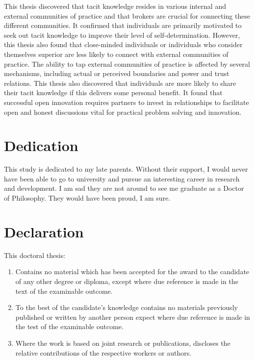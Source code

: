 \documentclass[12pt,table]{book}
\begin{document}
This thesis discovered that tacit knowledge resides in various internal and external communities of practice and that brokers are crucial for connecting these different communities. It confirmed that individuals are primarily motivated to seek out tacit knowledge to improve their level of self-determination. However, this thesis also found that close-minded individuals or individuals who consider themselves superior are less likely to connect with external communities of practice. The ability to tap external communities of practice is affected by several mechanisms, including actual or perceived boundaries and power and trust relations. This thesis also discovered that individuals are more likely to share their tacit knowledge if this delivers some personal benefit. It found that successful open innovation requires partners to invest in relationships to facilitate open and honest discussions vital for practical problem solving and innovation.

\chapter*{Dedication}

This study is dedicated to my late parents. Without their support, I would never have been able to go to university and pursue an interesting career in research and development. I am sad they are not around to see me graduate as a Doctor of Philosophy. They would have been proud, I am sure.

\chapter*{Declaration}

This doctoral thesis:

\begin{enumerate}
    \item Contains no material which has been accepted for the award to the candidate of any other degree or diploma, except where due reference is made in the text of the examinable outcome.
    \item To the best of the candidate’s knowledge contains no materials previously published or written by another person expect where due reference is made in the test of the examinable outcome.
    \item Where the work is based on joint research or publications, discloses the relative contributions of the respective workers or authors.
\end{enumerate} \bigskip
\end{document}

